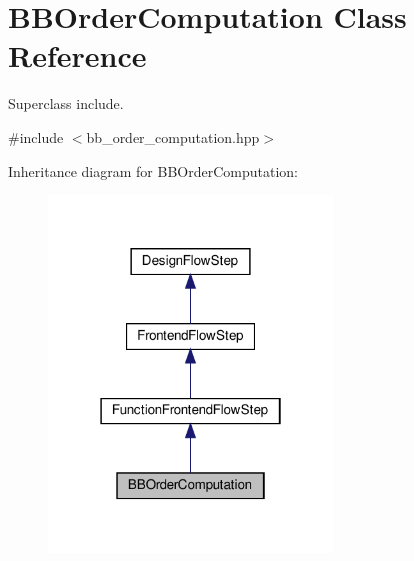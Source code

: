 \hypertarget{classBBOrderComputation}{}\section{B\+B\+Order\+Computation Class Reference}
\label{classBBOrderComputation}


Superclass include.  




{\ttfamily \#include $<$bb\+\_\+order\+\_\+computation.\+hpp$>$}



Inheritance diagram for B\+B\+Order\+Computation\+:
\nopagebreak
\begin{figure}[H]
\begin{center}
\leavevmode
\includegraphics[width=214pt]{dd/d81/classBBOrderComputation__inherit__graph}
\end{center}
\end{figure}


